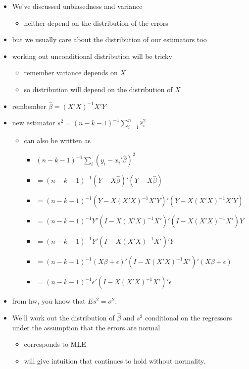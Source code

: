 \begin{itemize}
\item We've discussed unbiasedness and variance
\begin{itemize}
\item neither depend on the distribution of the errors
\end{itemize}
\item but we usually care about the distribution of our estimators too
\item working out unconditional distribution will be tricky
\begin{itemize}
\item remember variance depends on $X$
\item so distribution will depend on the distribution of $X$
\end{itemize}
\item rembember $\hat\beta = (X'X)^{-1} X'Y$
\item new estimator $s^2 = (n-k-1)^{-1} \sum_{i=1}^n \hat\epsilon_i^2$
\begin{itemize}
\item can also be written as
\begin{itemize}
\item $(n-k-1)^{-1} \sum_i (y_i - x_i'\hat\beta)^2$
\item $= (n-k-1)^{-1} (Y - X\hat\beta)'(Y - X\hat\beta)$
\item $= (n-k-1)^{-1} (Y - X(X'X)^{-1}X'Y)'(Y - X(X'X)^{-1}X'Y)$
\item $= (n-k-1)^{-1} Y'(I - X(X'X)^{-1}X')'(I - X(X'X)^{-1}X')Y$
\item $= (n-k-1)^{-1} Y'(I - X(X'X)^{-1}X')'Y$
\item $= (n-k-1)^{-1} (X\beta + \epsilon)'(I -
           X(X'X)^{-1}X')'(X\beta + \epsilon)$
\item $= (n-k-1)^{-1} \epsilon'(I - X(X'X)^{-1}X')'\epsilon$
\end{itemize}
\end{itemize}
\item from hw, you know that $E s^2 = \sigma^2$.
\item We'll work out the distribution of $\hat\beta$ and $s^2$
       conditional on the regressors under the assumption that the
       errors are normal
\begin{itemize}
\item corresponds to MLE
\item will give intuition that continues to hold without normality.
\end{itemize}
\end{itemize}

